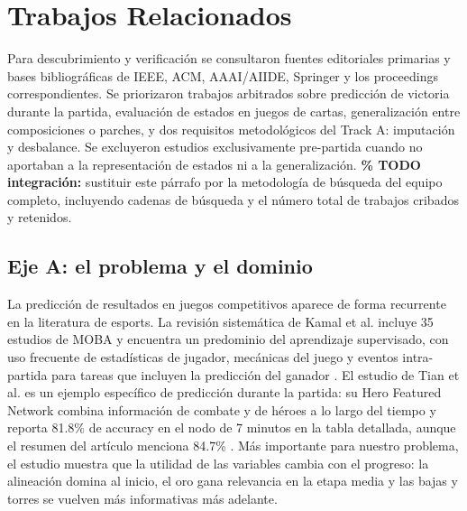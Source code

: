 \section{Trabajos Relacionados}
\label{sec:relacionados}

Para descubrimiento y verificación se consultaron
fuentes editoriales primarias y bases bibliográficas de IEEE, ACM,
AAAI/AIIDE, Springer y los proceedings correspondientes. Se priorizaron
trabajos arbitrados sobre predicción de victoria durante la partida,
evaluación de estados en juegos de cartas, generalización entre
composiciones o parches, y dos requisitos metodológicos del Track A:
imputación y desbalance. Se excluyeron estudios exclusivamente
pre-partida cuando no aportaban a la representación de estados ni a la
generalización. \textbf{\% TODO integración:} sustituir este párrafo por
la metodología de búsqueda del equipo completo, incluyendo cadenas de
búsqueda y el número total de trabajos cribados y retenidos.

\subsection{Eje A: el problema y el dominio}
\label{subsec:ejea}

La predicción de resultados en juegos competitivos aparece de forma
recurrente en la literatura de esports. La revisión sistemática de
Kamal et al. incluye 35 estudios de MOBA y encuentra un predominio del
aprendizaje supervisado, con uso frecuente de estadísticas de jugador,
mecánicas del juego y eventos intra-partida para tareas que incluyen la
predicción del ganador \cite{kamal_moba_2025}. El estudio de Tian et al.
es un ejemplo específico de predicción durante la partida: su Hero
Featured Network combina información de combate y de héroes a lo largo
del tiempo y reporta 81.8\% de accuracy en el nodo de 7 minutos en la
tabla detallada, aunque el resumen del artículo menciona 84.7\%
\cite{tian_hero_2022}. Más importante para nuestro problema, el estudio
muestra que la utilidad de las variables cambia con el progreso: la
alineación domina al inicio, el oro gana relevancia en la etapa media y
las bajas y torres se vuelven más informativas más adelante.


